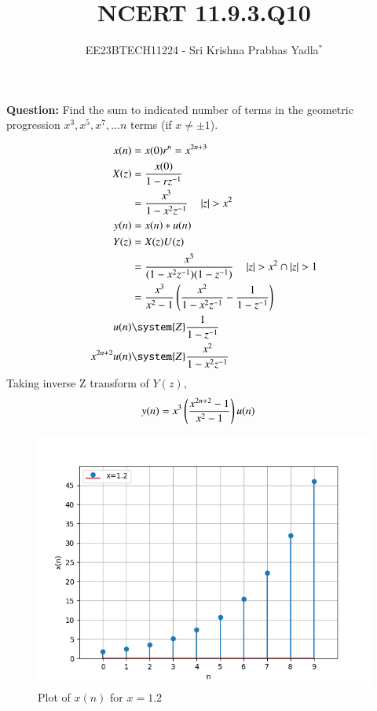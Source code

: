 \documentclass[journal,12pt,twocolumn]{IEEEtran}
\theoremstyle{remark}
\begin{document}

\vspace{3cm}

\title{NCERT 11.9.3.Q10}
\author{EE23BTECH11224 - Sri Krishna Prabhas Yadla$^{*}$%
}
\maketitle
\newpage
\bigskip

\renewcommand{\thefigure}{\arabic{figure}}
\renewcommand{\thetable}{\arabic{table}}


\vspace{3cm}
\textbf{Question:} Find the sum to indicated number of terms in the geometric progression $x^3,x^5,x^7,...n$ terms (if $x\neq\pm1$).
\\
\solution

\newline
\begin{align}
	x(n) &= x(0)r^n = x^{2n+3} \\
	X(z) &= \frac{x(0)}{1-rz^{-1}} \\
	&= \frac{x^3}{1-x^2z^{-1}} \quad \abs{z}>x^2 \\
	y(n) &= x(n) * u(n) \\
	Y(z) &= X(z)U(z) \\
	&= \frac{x^3}{(1-x^2z^{-1})(1-z^{-1})} \quad  \abs{z} > x^2 \cap \abs{z}>1\\
	&= \frac{x^3}{x^2-1}\brak{\frac{x^2}{1-x^2z^{-1}}-\frac{1}{1-z^{-1}}} \\
	u(n) &\system{Z} \frac{1}{1-z^{-1}} \\
	x^{2n+2} u(n) &\system{Z} \frac{x^2}{1-x^2z^{-1}}
\end{align}
Taking inverse Z transform of $Y(z)$,
\begin{align}
	y(n) &= x^3\left(\frac{x^{2n+2}-1}{x^2-1}\right)u(n)
\end{align}
\begin{figure}[ht!]
	\includegraphics[width=\columnwidth]{figs/plot_2.png}
	\caption{Plot of $x(n)$ for $x=1.2$}
	\label{fig:1.2}
\end{figure}
\end{document}
